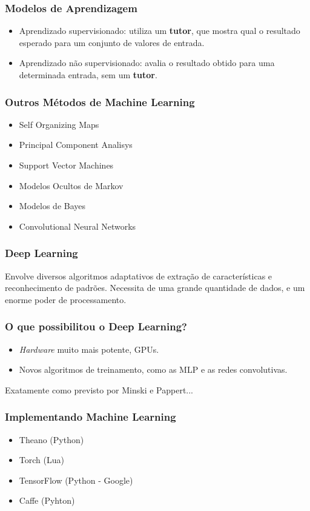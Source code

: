 \documentclass[aspectratio=169,12pt]{beamer}
\begin{document}
\begin{frame}
    \frametitle{Modelos de Aprendizagem}
    \begin{itemize}
        \setlength\itemsep{1em}
        \item Aprendizado supervisionado: utiliza um \textbf{tutor},
        que mostra qual o resultado esperado para um conjunto de
        valores de entrada.
        \item Aprendizado não supervisionado: avalia o resultado obtido
        para uma determinada entrada, sem um \textbf{tutor}.
    \end{itemize}
\end{frame}

\begin{frame}
    \frametitle{Outros Métodos de Machine Learning}
    \begin{itemize}
        \setlength\itemsep{1em}
        \item Self Organizing Maps
        \item Principal Component Analisys
        \item Support Vector Machines
        \item Modelos Ocultos de Markov
        \item Modelos de Bayes
        \item Convolutional Neural Networks
    \end{itemize}
\end{frame}

\begin{frame}
    \frametitle{Deep Learning}
    \vfill
    Envolve diversos algoritmos adaptativos de extração de características
    e reconhecimento de padrões.
    \vfill
    Necessita de uma grande quantidade de dados, e um enorme poder de
    processamento.
    \vfill
\end{frame}

\begin{frame}
    \frametitle{O que possibilitou o Deep Learning?}
    \vfill
    \begin{itemize}
        \setlength\itemsep{1em}
        \item{\emph{Hardware} muito mais potente, GPUs.}
        \item{Novos algoritmos de treinamento, como as MLP e as redes convolutivas.}
    \end{itemize}
    \vfill
    Exatamente como previsto por Minski e Pappert...
\end{frame}

\begin{frame}
    \frametitle{Implementando Machine Learning}
    \begin{itemize}
        \setlength\itemsep{1em}
        \item Theano (Python)
        \item Torch (Lua)
        \item TensorFlow (Python - Google)
        \item Caffe (Pyhton)
    \end{itemize}
\end{frame}
\end{document}
